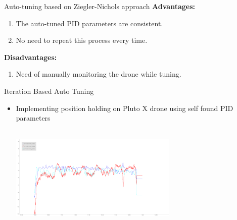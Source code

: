 \documentclass[10pt, a4paper]{beamer}
\begin{document}
\begin{frame}{Auto-tuning based on Ziegler-Nichols approach }
\textbf{Advantages:}\vspace{1em}
           	\begin{enumerate}
           	    \item The auto-tuned PID parameters are consistent.
           	    \item No need to repeat this process every time.
           	\end{enumerate}
           	
           	\vspace{4em}
           	\textbf{Disadvantages:}\vspace{1em}
           	\begin{enumerate}
           	    \item Need of manually monitoring the drone while tuning.
           	\end{enumerate}
           	
\end{frame}

\begin{frame}{Iteration Based Auto Tuning}
        \begin{itemize}
            \item Implementing position holding on Pluto X drone using self found PID parameters
            \vspace{1em}
            
            \includegraphics[width= 8cm , height=5cm]{PPT_Autotune1.png}
        
        \end{itemize}

\end{frame}
\end{document}

